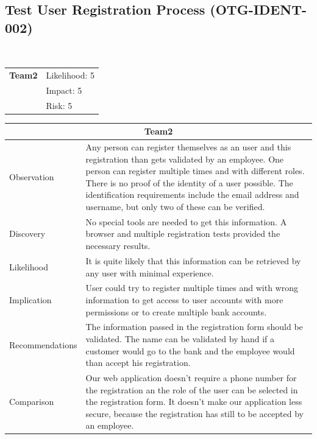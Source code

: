 \documentclass[headsepline,footsepline,footinclude=false,oneside,fontsize=11pt,paper=a4,listof=totoc,bibliography=totoc]{scrbook} %
\begin{document}
\pagebreak

\subsection{Test User Registration Process (OTG-IDENT-002)}\
\begin{tabular}{cR{12cm}}
	\textbf{Team2} & Likelihood: 5\\& Impact: 5\\& Risk: 5
\end{tabular}

\begin{tabular}{ l|p{11cm}  }
	\hline
	\multicolumn{2}{c}{\textbf{Team2}} \\
	\hline
	Observation   & Any person can register themselves as an user and this registration than gets validated by an employee. One person can register multiple times and with different roles. There is no proof of the identity of a user possible. The identification requirements include the email address and username, but only two of these can be verified. \\
	Discovery  & No special tools are needed to get this information. A browser and multiple registration tests provided the necessary results. \\
	Likelihood & It is quite likely that this information can be retrieved by any user with minimal experience. \\
	Implication    & User could try to register multiple times and with wrong information to get access to user accounts with more permissions or to create multiple bank accounts. \\
	Recommendations & The information passed in the registration form should be validated. The name can be validated by hand if a customer would go to the bank and the employee would than accept his registration. \\
	Comparison & Our web application doesn't require a phone number for the registration an the role of the user can be selected in the registration form. It doesn't make our application less secure, because the registration has still to be accepted by an employee. \\
	\hline
\end{tabular}
\\
\vspace{0.5cm}
\\
\end{document}

